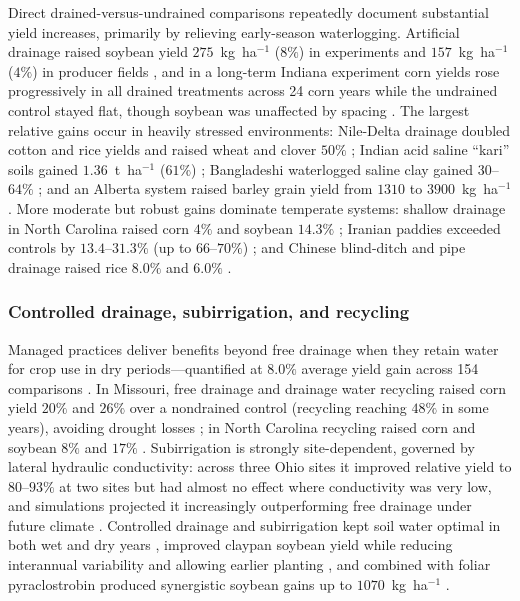 Direct drained-versus-undrained comparisons repeatedly document substantial
yield increases, primarily by relieving early-season waterlogging. Artificial
drainage raised soybean yield $275$~kg~ha$^{-1}$ ($8\%$) in experiments and
$157$~kg~ha$^{-1}$ ($4\%$) in producer fields \parencite{Mourtzinis2021}, and in
a long-term Indiana experiment corn yields rose progressively in all drained
treatments across 24 corn years while the undrained control stayed flat, though
soybean was unaffected by spacing \parencite{Rui2024,Kladivko2005}. The largest
relative gains occur in heavily stressed environments: Nile-Delta drainage
doubled cotton and rice yields and raised wheat and clover $50\%$
\parencite{ELMOWELHI1988}; Indian acid saline ``kari'' soils gained
$1.36$~t~ha$^{-1}$ ($61\%$) \parencite{Mathew2001}; Bangladeshi waterlogged
saline clay gained $30$--$64\%$ \parencite{Islam2025,Islam2022}; and an Alberta
system raised barley grain yield from $1310$ to $3900$~kg~ha$^{-1}$
\parencite{BENNETT1982}. More moderate but robust gains dominate temperate
systems: shallow drainage in North Carolina raised corn $4\%$ and soybean
$14.3\%$ \parencite{Watkins2024}; Iranian paddies exceeded controls by
$13.4$--$31.3\%$ (up to $66$--$70\%$) \parencite{DarziNaftchali2017b,DarziNaftchali2014};
and Chinese blind-ditch and pipe drainage raised rice $8.0\%$ and $6.0\%$
\parencite{Qi2025b}.

\subsubsection{Controlled drainage, subirrigation, and recycling}

Managed practices deliver benefits beyond free drainage when they retain water
for crop use in dry periods---quantified at $8.0\%$ average yield gain across
154 comparisons \parencite{Singh2022b}. In Missouri, free drainage and drainage
water recycling raised corn yield $20\%$ and $26\%$ over a nondrained control
(recycling reaching $48\%$ in some years), avoiding drought losses
\parencite{Kaur2021}; in North Carolina recycling raised corn and soybean $8\%$
and $17\%$ \parencite{Moursi2024}. Subirrigation is strongly site-dependent,
governed by lateral hydraulic conductivity: across three Ohio sites it improved
relative yield to $80$--$93\%$ at two sites but had almost no effect where
conductivity was very low, and simulations projected it increasingly
outperforming free drainage under future climate \parencite{Gunn2018,Gunn2019}.
Controlled drainage and subirrigation kept soil water optimal in both wet and
dry years \parencite{Niaghi2019}, improved claypan soybean yield while reducing
interannual variability and allowing earlier planting \parencite{Nelson2011},
and combined with foliar pyraclostrobin produced synergistic soybean gains up
to $1070$~kg~ha$^{-1}$ \parencite{Nelson2011b}.

